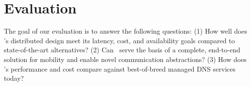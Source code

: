 \section{Evaluation}
\label{sec:eval}

The goal of our evaluation is to answer the following questions: (1) How well does \auspice's distributed design meet its latency, cost, and availability goals compared to state-of-the-art alternatives? (2) Can \auspice\ serve the basis of a complete, end-to-end solution for mobility and enable novel communication abstractions? (3) How does \auspice's performance and cost compare against best-of-breed managed DNS services today?


% 

